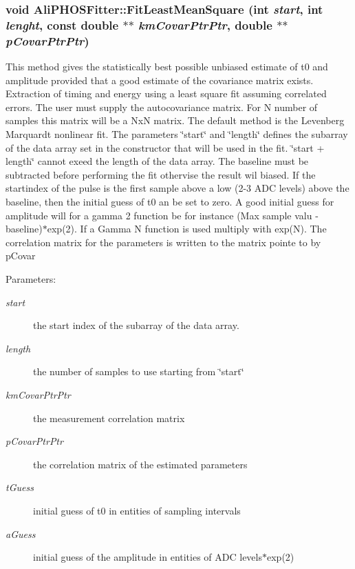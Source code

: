 \subsubsection{\setlength{\rightskip}{0pt plus 5cm}void Ali\-PHOSFitter::Fit\-Least\-Mean\-Square (int {\em start}, int {\em lenght}, const double $\ast$$\ast$ {\em km\-Covar\-Ptr\-Ptr}, double $\ast$$\ast$ {\em p\-Covar\-Ptr\-Ptr})}\label{classAliPHOSFitter_a8}


This method gives the statistically best possible unbiased estimate of t0 and amplitude provided that a good estimate of the covariance matrix exists. Extraction of timing and energy using a least square fit assuming correlated errors. The user must supply the autocovariance matrix. For N number of samples this matrix will be a Nx\-N matrix. The default method is the Levenberg Marquardt nonlinear fit. The parameters \char`\"{}start\char`\"{} and \char`\"{}length\char`\"{} defines the subarray of the data array set in the constructor that will be used in the fit. \char`\"{}start + length\char`\"{} cannot exeed the length of the data array. The baseline must be subtracted before performing the fit othervise the result wil biased. If the startindex of the pulse is the first sample above a low (2-3 ADC levels) above the baseline, then the initial guess of t0 an be set to zero. A good initial guess for amplitude will for a gamma 2 function be for instance (Max sample valu - baseline)$\ast$exp(2). If a Gamma N function is used multiply with exp(N). The correlation matrix for the parameters is written to the matrix pointe to by p\-Covar \begin{Desc}
\item[Parameters:]
\begin{description}
\item[{\em start}]the start index of the subarray of the data array. \item[{\em length}]the number of samples to use starting from \char`\"{}start\char`\"{} \item[{\em km\-Covar\-Ptr\-Ptr}]the measurement correlation matrix \item[{\em p\-Covar\-Ptr\-Ptr}]the correlation matrix of the estimated parameters \item[{\em t\-Guess}]initial guess of t0 in entities of sampling intervals \item[{\em a\-Guess}]initial guess of the amplitude in entities of ADC levels$\ast$exp(2) \end{description}
\end{Desc}
